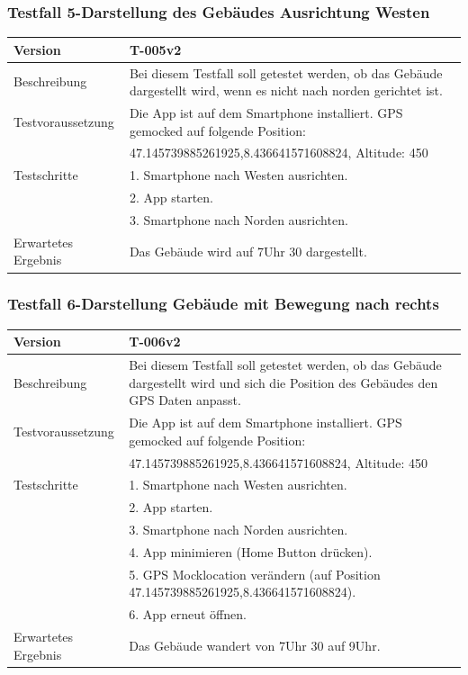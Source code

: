 \documentclass[a4paper]{scrreprt}
\begin{document}
\subsubsection{Testfall 5-Darstellung des Gebäudes Ausrichtung Westen}
\begin{tabularx}{\textwidth}{|l|X|}
\hline 
	Version &
	T-005v2 \\ 
\hline 
	Beschreibung & 
	Bei diesem Testfall soll getestet werden, ob das Gebäude dargestellt wird, wenn es nicht nach norden gerichtet ist. \\ 
\hline 
	Testvoraussetzung &
	Die App ist auf dem Smartphone installiert. GPS gemocked auf folgende Position: \\ &
		47.145739885261925,8.436641571608824, Altitude: 450 \\ 
\hline 
	Testschritte & 
		1. Smartphone nach Westen ausrichten. \\ &
		2. App starten. \\ &
		3. Smartphone nach Norden ausrichten. \\
\hline
	Erwartetes Ergebnis &
	Das Gebäude wird auf 7Uhr 30 dargestellt. \\ 
\hline 
\end{tabularx}
\subsubsection{Testfall 6-Darstellung Gebäude mit Bewegung nach rechts}
\begin{tabularx}{\textwidth}{|l|X|}
\hline 
	Version &
	T-006v2 \\ 
\hline 
	Beschreibung & 
	Bei diesem Testfall soll getestet werden, ob das Gebäude dargestellt wird und sich die Position des Gebäudes den GPS Daten anpasst. \\ 
\hline 
	Testvoraussetzung &
	Die App ist auf dem Smartphone installiert. GPS gemocked auf folgende Position: \\ &
		47.145739885261925,8.436641571608824, Altitude: 450 \\ 
\hline 
	Testschritte & 
		1. Smartphone nach Westen ausrichten. \\ &
		2. App starten. \\ &
		3. Smartphone nach Norden ausrichten. \\ &
		4. App minimieren (Home Button drücken). \\ &
		5. GPS Mocklocation verändern (auf Position 47.145739885261925,8.436641571608824). \\ &
		6. App erneut öffnen. \\
\hline
	Erwartetes Ergebnis &
	Das Gebäude wandert von 7Uhr 30 auf 9Uhr. \\ 
\hline 
\end{tabularx}
\end{document}
